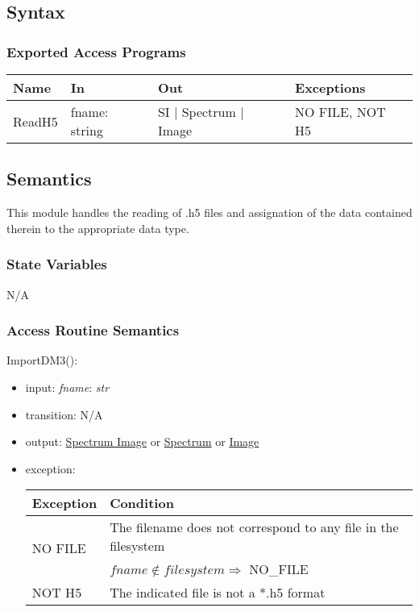 \documentclass[12pt, titlepage]{article}
\begin{document}
\subsection{Syntax}

\subsubsection{Exported Access Programs}

\begin{center}
\begin{tabular}{p{2cm} p{4cm} p{4cm} p{2cm}}
\hline
\textbf{Name} & \textbf{In} & \textbf{Out} & \textbf{Exceptions} \\
\hline
ReadH5 & fname: string & SI $|$ Spectrum $|$ Image & NO FILE, NOT H5 \\
\hline
\end{tabular}
\end{center}

\subsection{Semantics}
This module handles the reading of .h5 files and assignation of the data contained therein to the appropriate data type.

\subsubsection{State Variables}
N/A

\subsubsection{Access Routine Semantics}

\noindent ImportDM3():
\begin{itemize}
    \item input: \textit{fname}: \textit{str}
    \item transition: N/A
    \item output: \hyperref[Mod:SI]{Spectrum Image} or \hyperref[Mod:Spectrum]{Spectrum} or \hyperref[Mod:Image]{Image}
    \item exception: 
    \begin{center}
        \begin{tabular}{p{3cm} p{12cm}}
            \toprule[0.15em]
            \textbf{Exception} & \textbf{Condition}\\
            \midrule[0.1em]
            \multirow{2}{0.25\textwidth}{NO FILE} & The filename does not correspond to any file in the filesystem\\ 
            & $fname \notin filesystem \Rightarrow$ NO\_FILE\\ 
            \midrule[0.05em]
            NOT H5 & The indicated file is not a *.h5 format\\
            \bottomrule[0.15em]
        \end{tabular}
    \end{center}
\end{itemize}
\end{document}
